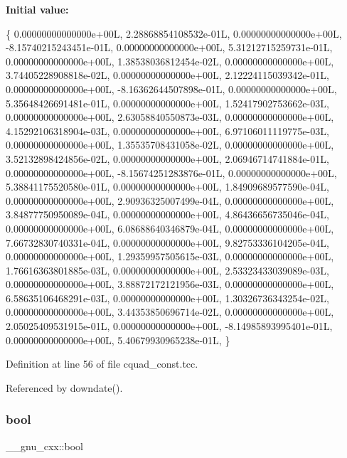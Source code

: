 {\bfseries Initial value\+:}
\begin{DoxyCode}
\{
   0.00000000000000e+00L, 2.28868854108532e-01L, 0.00000000000000e+00L,
  -8.15740215243451e-01L, 0.00000000000000e+00L, 5.31212715259731e-01L,
   0.00000000000000e+00L, 1.38538036812454e-02L, 0.00000000000000e+00L,
   3.74405228908818e-02L, 0.00000000000000e+00L, 2.12224115039342e-01L,
   0.00000000000000e+00L, -8.16362644507898e-01L, 0.00000000000000e+00L,
   5.35648426691481e-01L, 0.00000000000000e+00L, 1.52417902753662e-03L,
   0.00000000000000e+00L, 2.63058840550873e-03L, 0.00000000000000e+00L,
   4.15292106318904e-03L, 0.00000000000000e+00L, 6.97106011119775e-03L,
   0.00000000000000e+00L, 1.35535708431058e-02L, 0.00000000000000e+00L,
   3.52132898424856e-02L, 0.00000000000000e+00L, 2.06946714741884e-01L,
   0.00000000000000e+00L, -8.15674251283876e-01L, 0.00000000000000e+00L,
   5.38841175520580e-01L, 0.00000000000000e+00L, 1.84909689577590e-04L,
   0.00000000000000e+00L, 2.90936325007499e-04L, 0.00000000000000e+00L,
   3.84877750950089e-04L, 0.00000000000000e+00L, 4.86436656735046e-04L,
   0.00000000000000e+00L, 6.08688640346879e-04L, 0.00000000000000e+00L,
   7.66732830740331e-04L, 0.00000000000000e+00L, 9.82753336104205e-04L,
   0.00000000000000e+00L, 1.29359957505615e-03L, 0.00000000000000e+00L,
   1.76616363801885e-03L, 0.00000000000000e+00L, 2.53323433039089e-03L,
   0.00000000000000e+00L, 3.88872172121956e-03L, 0.00000000000000e+00L,
   6.58635106468291e-03L, 0.00000000000000e+00L, 1.30326736343254e-02L,
   0.00000000000000e+00L, 3.44353850696714e-02L, 0.00000000000000e+00L,
   2.05025409531915e-01L, 0.00000000000000e+00L, -8.14985893995401e-01L,
   0.00000000000000e+00L, 5.40679930965238e-01L,
\}
\end{DoxyCode}


Definition at line 56 of file cquad\+\_\+const.\+tcc.



Referenced by downdate().

\mbox{\label{namespace____gnu__cxx_ae83aca57f97767d5d09188718728a0ac}} 
\subsubsection{\texorpdfstring{bool}{bool}}
{\footnotesize\ttfamily \+\_\+\+\_\+gnu\+\_\+cxx\+::bool}

